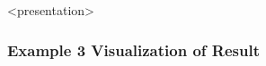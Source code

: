 \begin{frame}<presentation>
\frametitle{Example 3 Visualization of Result}
\begin{center}
\end{center}
\end{frame}


